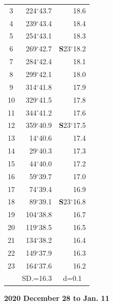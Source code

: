 \documentclass[10pt, a4paper]{report}
\begin{document}
\begin{scriptsize}
\begin{tabular*}{0.2\textwidth}[t]{@{\extracolsep{\fill}}|c|rr|}
3 & 224$^\circ$43.7 & \raisebox{0.24ex}{\boldmath$\cdot$~\boldmath$\cdot$~~}18.6\\
4 & 239$^\circ$43.4 & 18.4\\
5 & 254$^\circ$43.1 & 18.3\\[2Pt]
6 & 269$^\circ$42.7 & \textbf{S}23$^\circ$18.2\\
7 & 284$^\circ$42.4 & 18.1\\
8 & 299$^\circ$42.1 & 18.0\\
9 & 314$^\circ$41.8 & \raisebox{0.24ex}{\boldmath$\cdot$~\boldmath$\cdot$~~}17.9\\
10 & 329$^\circ$41.5 & 17.8\\
11 & 344$^\circ$41.2 & 17.6\\[2Pt]
12 & 359$^\circ$40.9 & \textbf{S}23$^\circ$17.5\\
13 & 14$^\circ$40.6 & 17.4\\
14 & 29$^\circ$40.3 & 17.3\\
15 & 44$^\circ$40.0 & \raisebox{0.24ex}{\boldmath$\cdot$~\boldmath$\cdot$~~}17.2\\
16 & 59$^\circ$39.7 & 17.0\\
17 & 74$^\circ$39.4 & 16.9\\[2Pt]
18 & 89$^\circ$39.1 & \textbf{S}23$^\circ$16.8\\
19 & 104$^\circ$38.8 & 16.7\\
20 & 119$^\circ$38.5 & 16.5\\
21 & 134$^\circ$38.2 & \raisebox{0.24ex}{\boldmath$\cdot$~\boldmath$\cdot$~~}16.4\\
22 & 149$^\circ$37.9 & 16.3\\
23 & 164$^\circ$37.6 & 16.2\\
\hline
\rule{0pt}{2.4ex} & \multicolumn{1}{c}{SD.=16.3} & \multicolumn{1}{c|}{d=0.1}\\
\hline
\end{tabular*}

\end{scriptsize}
\newpage
\sffamily
\noindent
\begin{flushright}
\textbf{2020 December 28 to Jan. 11}\par
\end{flushright}
\end{document}
